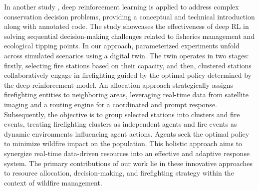 \documentclass[lettersize,journal]{IEEEtran}
\begin{document}
In another study \cite{noauthor_deep_nodate}, deep reinforcement learning is applied to address complex conservation decision problems, providing a conceptual and technical introduction along with annotated code. The study showcases the effectiveness of deep RL in solving sequential decision-making challenges related to fisheries management and ecological tipping points.
In our approach, parameterized experiments unfold across simulated scenarios using a digital twin. The twin operates in two stages: firstly, selecting fire stations based on their capacity, and then, clustered stations collaboratively engage in firefighting guided by the optimal policy determined by the deep reinforcement model. An allocation approach strategically assigns firefighting entities to neighboring areas, leveraging real-time data from satellite imaging and a routing engine for a coordinated and prompt response.
Subsequently, the objective is to group selected stations into clusters and fire events, treating firefighting clusters as independent agents and fire events as dynamic environments influencing agent actions. Agents seek the optimal policy to minimize wildfire impact on the population. This holistic approach aims to synergize real-time data-driven resources into an effective and adaptive response system. The primary contributions of our work lie in these innovative approaches to resource allocation, decision-making, and firefighting strategy within the context of wildfire management.
\end{document}
